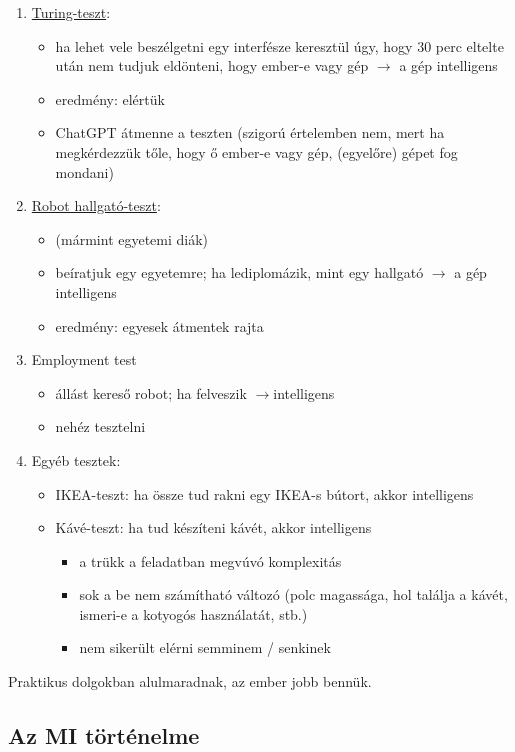 \documentclass[a4paper, 11pt]{article}
\begin{document}
\begin{enumerate}
	\item \underline{Turing-teszt}:
	\begin{itemize}
		\item ha lehet vele beszélgetni egy interfésze keresztül úgy, hogy 30 perc eltelte után nem tudjuk eldönteni, hogy ember-e vagy gép $\to$ a gép intelligens
		\item eredmény: elértük
		\item ChatGPT átmenne a teszten (szigorú értelemben nem, mert ha megkérdezzük tőle, hogy ő ember-e vagy gép, (egyelőre) gépet fog mondani)
	\end{itemize}
	\item \underline{Robot hallgató-teszt}:
	\begin{itemize}
		\item (mármint egyetemi diák)
		\item beíratjuk egy egyetemre; ha lediplomázik, mint egy hallgató $\to$ a gép intelligens
		\item eredmény: egyesek átmentek rajta
	\end{itemize}
	\item Employment test
	\begin{itemize}
		\item állást kereső robot; ha felveszik $\to$intelligens
		\item nehéz tesztelni
	\end{itemize}
	\item Egyéb tesztek:
	\begin{itemize}
		\item IKEA-teszt: ha össze tud rakni egy IKEA-s bútort, akkor intelligens
		\item Kávé-teszt: ha tud készíteni kávét, akkor intelligens
		\begin{itemize}
			\item a trükk a feladatban megvúvó komplexitás
			\item sok a be nem számítható változó (polc magassága, hol találja a kávét, ismeri-e a kotyogós használatát, stb.)
			\item nem sikerült elérni semminem / senkinek
		\end{itemize}
	\end{itemize}
\end{enumerate}

Praktikus dolgokban alulmaradnak, az ember jobb bennük.

\subsection{Az MI történelme}
\end{document}
